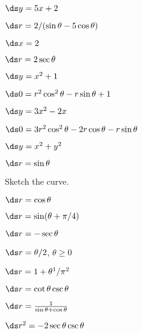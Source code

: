 \begin{exercises}
\begin{exercise}
\begin{exercise} $\ds y=5x+2$
\begin{answer} $\ds r=2/(\sin\theta-5\cos\theta)$
\end{answer}\end{exercise}

\begin{exercise} $\ds x=2$
\begin{answer} $\ds r=2\sec\theta$
\end{answer}\end{exercise}

\begin{exercise} $\ds y=x^2+1$
\begin{answer} $\ds 0=r^2\cos^2\theta-r\sin\theta+1$
\end{answer}\end{exercise}

\begin{exercise} $\ds y=3x^2-2x$
\begin{answer} $\ds 0=3r^2\cos^2\theta-2r\cos\theta-r\sin\theta$
\end{answer}\end{exercise}

\begin{exercise} $\ds y=x^2+y^2$
\begin{answer} $\ds r=\sin\theta$
\end{answer}\end{exercise}

\endtwocol
\bsk
\noindent Sketch the curve.
\twocol

\begin{exercise} $\ds r=\cos\theta$

\begin{exercise} $\ds r=\sin(\theta+\pi/4)$

\begin{exercise} $\ds r=-\sec\theta$

\begin{exercise} $\ds r=\theta/2$, $\theta\ge0$

\begin{exercise} $\ds r=1+\theta^1/\pi^2$

\begin{exercise} $\ds r=\cot\theta\csc\theta$

\begin{exercise} $\ds r={1\over\sin\theta+\cos\theta}$

\begin{exercise} $\ds r^2=-2\sec\theta\csc\theta$


\end{exercise}
\end{exercise}
\end{exercise}
\end{exercise}
\end{exercise}
\end{exercise}
\end{exercise}
\end{exercise}
\end{exercise}
\end{exercises}
